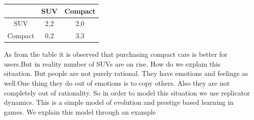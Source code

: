 \documentclass[letterpaper,english,10pt]{article}
\begin{document}
\begin{table}[ht]
\begin{center}
\begin{tabular}{|c|c|c|}
\hline
                   & SUV           & Compact        \\ \hline
SUV                 & 2,2       & 2,0      \\ \hline
Compact                  & 0,2         & 3,3      \\ \hline
\end{tabular}
\end{center}
\end{table}
As from the table it is observed that purchasing compact cars is better for users.But in reality number of SUVs are on rise. How do we explain this situation. But people are not purely rational. They have emotions and feelings as well.One thing they do out of emotions is to copy others. Also they are not completely out of rationality. So in  order to model this situation we use replicator dynamics.
This is a simple model of evolution and prestige based learning in games. We explain this model through an example\\ 
\end{document}
